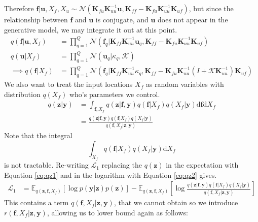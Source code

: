 \documentclass[12pt]{article}
\newcommand{\Kappa}{\mathcal{K}}
\newcommand{\ub}{\mathbf{u}}
\newcommand{\zb}{\mathbf{z}}
\newcommand{\fb}{\mathbf{f}}
\newcommand{\yb}{\mathbf{y}}
\newcommand{\dd}{\mathrm{d}}
\newcommand{\Lo}{\mathcal{L}_1}
\newcommand{\Kff}{\mathbf{K}_{ff}}
\newcommand{\Kuu}{\mathbf{K}_{uu}}
\newcommand{\Kuf}{\mathbf{K}_{uf}}
\newcommand{\Kfu}{\mathbf{K}_{fu}}
\newcommand{\Ex}{\mathbb{E}}
\newcommand{\No}{\mathcal{N}}
\begin{document}
Therefore $\fb|\ub,X_f,X_u \sim \mathcal{N}(\Kfu\Kuu^{-1}\ub, \Kff - \Kfu\Kuu^{-1}\Kuf)$, but since the relationship between $\fb$ and $\ub$ is conjugate, and $\ub$ does not appear in the generative model, we may integrate it out at this point.
%
\begin{align}
    q(\fb|\ub,X_f) &= \prod_{q=1}^Q \No(\fb_q | \Kff\Kuu^{-1}\ub_q, \Kff - \Kfu\Kuu^{-1}\Kuf)\\
    q(\ub|X_f) &= \prod_{q=1}^Q \No(\ub_q|\kappa_q, \Kappa)\\
    \implies q(\fb|X_f) &= \prod_{q=1}^Q \No(\fb_q | \Kff\Kuu^{-1}\kappa_q, \Kff - \Kfu\Kuu^{-1}(I + \Kappa\Kuu^{-1})\Kuf)
\end{align}
%
We also want to treat the input locations $X_f$ as random variables with distribution $q(X_f)$ who's parameters we control.
%
\begin{align}
q(\zb|\yb) &= \int_{\fb,X_f} q(\zb|\fb,\yb)q(\fb|X_f)q(X_f|\yb) \dd\fb \dd X_f \label{eq:qz1} \\
&= \frac{q(\zb |\fb, \yb)q(\fb|X_f)q(X_f|\yb)}{q(\fb,X_f|\zb,\yb)} \label{eq:qz2}
\end{align}
%
Note that the integral
%
\begin{equation}
\int_{X_f} q(\fb|X_f)q(X_f|\yb) \dd X_f
\end{equation}
%
is not tractable.
%
Re-writing $\Lo$ replacing the $q(\zb)$ in the expectation with Equation \ref{eq:qz1} and in the logarithm with Equation \ref{eq:qz2} gives.
%
\begin{align}
\Lo &= \Ex_{q(\zb,\fb,X_f)}[\log p(\yb|\zb)p(\zb)] - \Ex_{q(\zb,\fb,X_f)}\left[\log\frac{q(\zb |\fb, \yb)q(\fb|X_f)q(X_f|\yb)}{q(\fb,X_f|\zb,\yb)}\right]
\end{align}
%
This contains a term $q(\fb,X_f|\zb,\yb)$, that we cannot obtain so we introduce $r(\fb,X_f|\zb,\yb)$, allowing us to lower bound again as follows:
%
\end{document}
